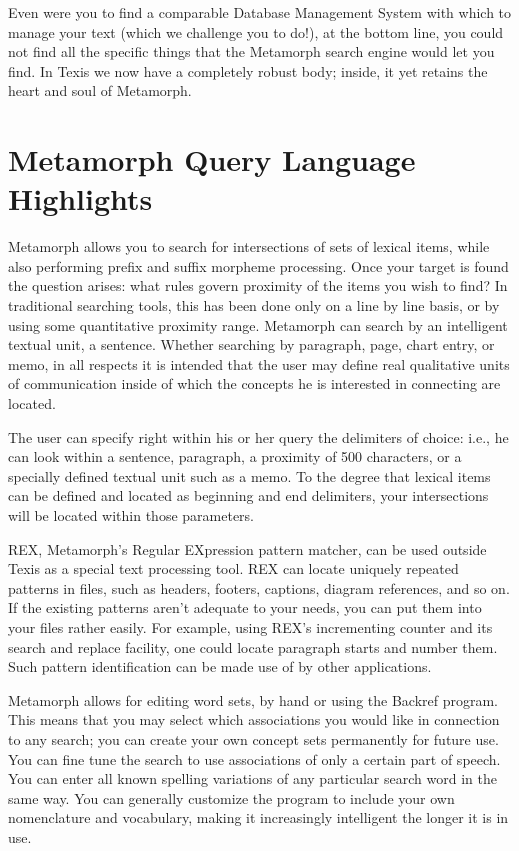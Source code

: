 Even were you to find a comparable Database Management System with
which to manage your text (which we challenge you to do!), at the
bottom line, you could not find all the specific things that the
Metamorph search engine would let you find.  In Texis we now have a
completely robust body; inside, it yet retains the heart and soul of
Metamorph.


\section{Metamorph Query Language Highlights}

Metamorph allows you to search for intersections of sets of lexical
items, while also performing prefix and suffix morpheme processing.
Once your target is found the question arises:  what rules govern
proximity of the items you wish to find?  In traditional searching
tools, this has been done only on a line by line basis, or by using
some quantitative proximity range.  Metamorph can search by an
intelligent textual unit, a sentence.  Whether searching by paragraph,
page, chart entry, or memo, in all respects it is intended that the
user may define real qualitative units of communication inside of
which the concepts he is interested in connecting are located.

The user can specify right within his or her query the delimiters of
choice:  i.e., he can look within a sentence, paragraph, a proximity
of 500 characters, or a specially defined textual unit such as a memo.
To the degree that lexical items can be defined and located as
beginning and end delimiters, your intersections will be located
within those parameters.

REX, Metamorph's Regular EXpression pattern matcher, can be used
outside Texis as a special text processing tool.  REX can locate
uniquely repeated patterns in files, such as headers, footers,
captions, diagram references, and so on.  If the existing patterns
aren't adequate to your needs, you can put them into your files rather
easily.  For example, using REX's incrementing counter and its search
and replace facility, one could locate paragraph starts and number
them.  Such pattern identification can be made use of by other
applications.

Metamorph allows for editing word sets, by hand or using the Backref
program.  This means that you may select which associations you would
like in connection to any search; you can create your own concept sets
permanently for future use.  You can fine tune the search to use
associations of only a certain part of speech.  You can enter all
known spelling variations of any particular search word in the same
way.  You can generally customize the program to include your own
nomenclature and vocabulary, making it increasingly intelligent the
longer it is in use.


